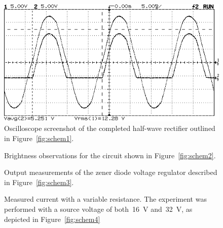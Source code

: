 \begin{figure}[H]
	\centering
	
\end{figure}

\begin{figure}[H]
	\centering
	
\end{figure}

\begin{figure}[H]
	\centering
	\includegraphics[width=.6\textwidth]{img/ss1.png}
	\caption{Oscilloscope screenshot of the completed half-wave rectifier
		outlined in Figure~\ref{fig:schem1}.}
	\label{fig:ck1data}
\end{figure}

\begin{figure}[H]
	\centering
	
	\caption{Brightness observations for the circuit shown in
		Figure~\ref{fig:schem2}.}
	\label{tab:ckt2data}
\end{figure}

\begin{figure}[H]
	\centering
	
	\caption{Output measurements of the zener diode voltage
		regulator described in Figure~\ref{fig:schem3}.}
	\label{tab:ckt3data}
\end{figure}

\begin{figure}[H]
	\centering
	
	\caption{Measured current with a variable resistance.  The experiment was
		performed with a source voltage of both~\SI{16}{\volt}
		and~\SI{32}{\volt}, as depicted in Figure~\ref{fig:schem4}}
	\label{tab:ckt4data}
\end{figure}
